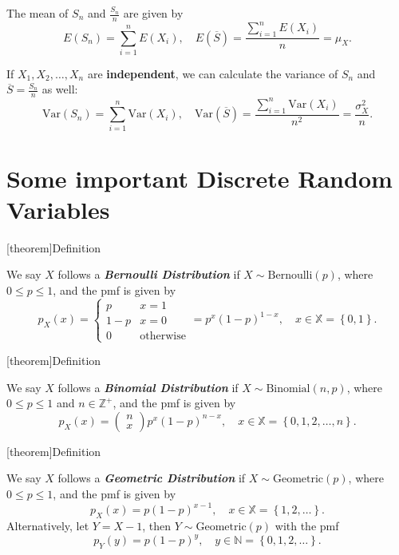 \documentclass[12pt]{report}
\theoremstyle{definition}
\begin{document}
\bigskip
The mean of $S_n$ and $\frac{S_n}{n}$ are given by
\[
    E(S_n)=\sum_{i=1}^{n} E(X_i),\quad 
    E\left(\overline{S}\right)=\frac{\sum_{i=1}^{n} E(X_i)}{n}=\mu_X.
\]

If $X_1,X_2,\ldots,X_n$ are \textbf{independent}, we can calculate the variance
of $S_n$ and $\overline{S}=\frac{S_n}{n}$ as well:
\[
    \text{Var}(S_n)=\sum_{i=1}^{n} \text{Var}(X_i),\quad
    \text{Var}(\overline{S})=\frac{\sum_{i=1}^{n}
    \text{Var}(X_i)}{n^{2}}=\frac{\sigma_X^{2}}{n}.
\]

\section{Some important Discrete Random Variables}

[theorem]{Definition}
\begin{bernoulli distribution}
    We say $X$ follows a \textbf{\emph{Bernoulli Distribution}} if $X\sim 
    \text{Bernoulli}(p)$, where $0\le p\le 1$, and the pmf is given by
    \[
        p_X(x)=
        \begin{cases}
            p & x=1 \\
            1-p & x=0 \\
            0 & \text{otherwise}
        \end{cases} 
        = p^{x}{(1-p)}^{1-x}, \quad x\in\mathbb{X}=\left\{0,1\right\}.
    \]
\end{bernoulli distribution}

[theorem]{Definition}
\begin{bionomial distribution}
    We say $X$ follows a \textbf{\emph{Binomial Distribution}} if $X\sim
    \text{Binomial}(n, p)$, where $0\le p \le 1$ and $n\in\mathbb{Z}^+$, 
    and the pmf is given by
    \[
        p_{X}(x)=\begin{pmatrix}
                n \\
                x
            \end{pmatrix} p^{x}{(1-p)}^{n-x}, \quad
            x\in\mathbb{X}=\left\{0,1,2,\ldots,n\right\}.
    \]
\end{bionomial distribution}

[theorem]{Definition}
\begin{geometric distribution}
    We say $X$ follows a \textbf{\emph{Geometric Distribution}} if $X\sim
    \text{Geometric}(p)$, where $0\le p\le 1$, and the pmf is given by
    \[
        p_{X}(x)=p{(1-p)}^{x-1}, \quad
        x\in\mathbb{X}=\left\{1,2,\ldots\right\}.
    \]
    Alternatively, let $Y=X-1$, then $Y\sim\text{Geometric}(p)$ with the pmf
    \[
        p_Y(y)=p{(1-p)}^{y}, \quad y\in\mathbb{N}=\left\{0,1,2,\ldots\right\}.
    \]
\end{geometric distribution}
\end{document}

